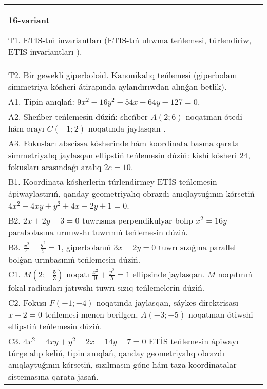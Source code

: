 \documentclass{article}
\begin{document}
\begin{tabular}{m{17cm}}
\textbf{16-variant}
\newline

T1. ETIS-tıń invariantları (ETIS-tıń ulıwma teńlemesi, túrlendiriw, ETIS invariantları ).\\

T2. Bir gewekli giperboloid. Kanonikalıq teńlemesi (giperbolanı simmetriya kósheri átirapında aylandırıwdan alınǵan betlik).\\

A1. Tipin anıqlań: $9 x^{2}-16 y^{2}-54 x-64 y-127=0$.\\

A2. Sheńber teńlemesin dúziń: sheńber $A (2;6 ) $ noqatınan ótedi hám orayı $C (-1;2) $ noqatında jaylasqan .\\

A3. Fokusları abscissa kósherinde hám koordinata basına qarata simmetriyalıq jaylasqan ellipstiń teńlemesin dúziń: kishi kósheri $24$, fokusları arasındaǵı aralıq $2 c=10$.\\

B1. Koordinata kósherlerin túrlendirmey ETİS teńlemesin ápiwaylastırıń, qanday geometriyalıq obrazdı anıqlaytuǵının kórsetiń $4x^{2} - 4xy + y^{2} + 4x - 2y + 1 = 0$.  \\

B2. $2x + 2y - 3 = 0$ tuwrısına perpendikulyar bolıp $x^{2} = 16y$ parabolasına urınıwshı tuwrınıń teńlemesin dúziń.  \\

B3. $\frac{x^{2}}{4} - \frac{y^{2}}{5} = 1$, giperbolanıń $3x - 2y = 0$ tuwrı sızıǵına parallel bolǵan urınbasınıń teńlemesin dúziń.  \\

C1. $M(2; - \frac{5}{3})$ noqatı $\frac{x^{2}}{9} + \frac{y^{2}}{5} = 1$ ellipsinde jaylasqan. $M$ noqatınıń fokal radiusları jatıwshı tuwrı sızıq teńlemelerin dúziń.  \\

C2. Fokusı $F( - 1; - 4)$ noqatında jaylasqan, sáykes direktrisası $x - 2 = 0$ teńlemesi menen berilgen, $A( - 3; - 5)$ noqatınan ótiwshi ellipstiń teńlemesin dúziń.  \\

C3. $4x^{2} - 4xy + y^{2} - 2x - 14y + 7 = 0$ ETİS teńlemesin ápiwayı túrge alıp keliń, tipin anıqlań, qanday geometriyalıq obrazdı anıqlaytuǵının kórsetiń, sızılmasın góne hám taza koordinatalar sistemasına qarata jasań.  \\

\end{tabular}
\vspace{1cm}
\end{document}
